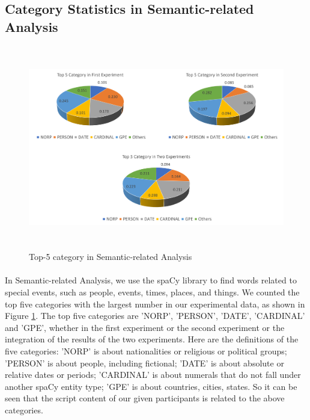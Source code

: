 \documentclass[a4paper,12pt]{report}
\begin{document}
\subsection{Category Statistics in Semantic-related Analysis}
\begin{figure}[btph]
\begin{center}
\includegraphics[width=5.775in,height=3.5in]{images and data/Result_CategoryStatistic.png}
\caption{Top-5 category in Semantic-related Analysis}
\label{f:Result_CategoryStatistic}
\end{center}
\end{figure}
\paragraph{}
In Semantic-related Analysis, we use the spaCy library to find words related to special events, such as people, events, times, places, and things. We counted the top five categories with the largest number in our experimental data, as shown in Figure \ref{f:Result_CategoryStatistic}. The top five categories are 'NORP', 'PERSON', 'DATE', 'CARDINAL' and 'GPE', whether in the first experiment or the second experiment or the integration of the results of the two experiments. Here are the definitions of the five categories: 'NORP' is about nationalities or religious or political groups; 'PERSON' is about people, including fictional; 'DATE' is about absolute or relative dates or periods; 'CARDINAL' is about numerals that do not fall under another spaCy entity type; 'GPE' is about countries, cities, states. So it can be seen that the script content of our given participants is related to the above categories.
\end{document}
